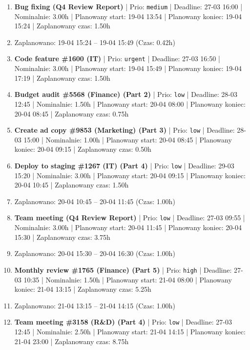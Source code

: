 {\begin{enumerate}
  \item [\textbf{14647}] \textbf{Bug fixing (Q4 Review Report)} | Prio: \texttt{medium} | Deadline: 27-03 16:00 | Nominalnie: 3.00h | Planowany start: 19-04 13:54 | Planowany koniec: 19-04 15:24 | Zaplanowany czas: 1.50h
  \item [\textbf{PRZERWA}] Zaplanowano: 19-04 15:24 -- 19-04 15:49 (Czas: 0.42h)
  \item [\textbf{14605}] \textbf{Code feature \#1600 (IT)} | Prio: \texttt{urgent} | Deadline: 27-03 16:50 | Nominalnie: 3.00h | Planowany start: 19-04 15:49 | Planowany koniec: 19-04 17:19 | Zaplanowany czas: 1.50h
  \item [\textbf{14693}] \textbf{Budget audit \#5568 (Finance) (Part 2)} | Prio: \texttt{low} | Deadline: 28-03 12:45 | Nominalnie: 1.50h | Planowany start: 20-04 08:00 | Planowany koniec: 20-04 08:45 | Zaplanowany czas: 0.75h
  \item [\textbf{14679}] \textbf{Create ad copy \#9853 (Marketing) (Part 3)} | Prio: \texttt{low} | Deadline: 28-03 15:00 | Nominalnie: 1.00h | Planowany start: 20-04 08:45 | Planowany koniec: 20-04 09:15 | Zaplanowany czas: 0.50h
  \item [\textbf{14686}] \textbf{Deploy to staging \#1267 (IT) (Part 4)} | Prio: \texttt{low} | Deadline: 29-03 15:20 | Nominalnie: 3.00h | Planowany start: 20-04 09:15 | Planowany koniec: 20-04 10:45 | Zaplanowany czas: 1.50h
  \item [\textbf{PRZERWA}] Zaplanowano: 20-04 10:45 -- 20-04 11:45 (Czas: 1.00h)
  \item [\textbf{14682}] \textbf{Team meeting (Q4 Review Report)} | Prio: \texttt{low} | Deadline: 27-03 09:55 | Nominalnie: 3.00h | Planowany start: 20-04 11:45 | Planowany koniec: 20-04 15:30 | Zaplanowany czas: 3.75h
  \item [\textbf{PRZERWA}] Zaplanowano: 20-04 15:30 -- 20-04 16:30 (Czas: 1.00h)
  \item [\textbf{14627}] \textbf{Monthly review \#1765 (Finance) (Part 5)} | Prio: \texttt{high} | Deadline: 27-03 10:35 | Nominalnie: 1.50h | Planowany start: 21-04 08:00 | Planowany koniec: 21-04 13:15 | Zaplanowany czas: 5.25h
  \item [\textbf{PRZERWA}] Zaplanowano: 21-04 13:15 -- 21-04 14:15 (Czas: 1.00h)
  \item [\textbf{14688}] \textbf{Team meeting \#3158 (R\&D) (Part 4)} | Prio: \texttt{low} | Deadline: 27-03 12:45 | Nominalnie: 2.50h | Planowany start: 21-04 14:15 | Planowany koniec: 21-04 23:00 | Zaplanowany czas: 8.75h
\end{enumerate}
}

